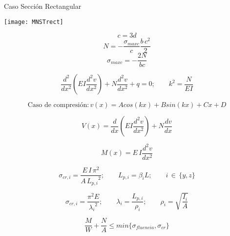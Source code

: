 \vspace{0.6cm}
Caso Sección Rectangular

\begin{minipage}{0.33\textwidth}
	\texttt{[image: MNSTrect]}
\end{minipage}
\begin{minipage}{0.66\textwidth}
	\vspace{0.4cm}
	$$
	c=3d
	$$
	\vspace{0.02cm}
	$$
	N=-\frac{\sigma_{maxc}}{c}\frac{b\, c^2}{2}
	$$
	\vspace{0.02cm}
	$$
	\sigma_{maxc}=-\frac{2N}{bc}
	$$
\end{minipage}

\vspace{0.2cm}
\begin{center}
\end{center}

$$
\frac{d^2}{dx^2}\left(EI\frac{d^2 v}{dx^2}\right) + N\frac{d^2 v}{dx^2} + q =0 ;
\qquad
k^2=\frac{N}{EI}
$$

$$
\text{Caso de compresión}: v(x)= Acos(kx) + Bsin(kx) + Cx + D
$$

$$
V(x) = \frac{d}{dx}\left(EI\frac{d^2 v}{dx^2}\right) + N\frac{dv}{dx}
$$

$$
M(x) = E \, I\frac{d^2 v}{dx^2}
$$


$$
\sigma_{cr,i}=\frac{E\,I\,\pi^2}{A\, {L_{p,i}}^2} ;
\qquad
L_{p,i}=\beta_i L ;
\qquad
i \, \in \, \{y,z\}
$$

$$
\sigma_{cr,i}= \frac {\pi^2 E}{{\lambda_i}^2} ;
\qquad
\lambda_i=\frac{L_{p,i}}{\rho_i} ;
\qquad
\rho_i=\sqrt{\frac{I_i}{A}}
$$

$$
\frac{M}{W} + \frac{N}{A} \leq min \{\sigma_{fluencia}, \sigma_{cr}\}
$$


\begin{center}
\end{center}

